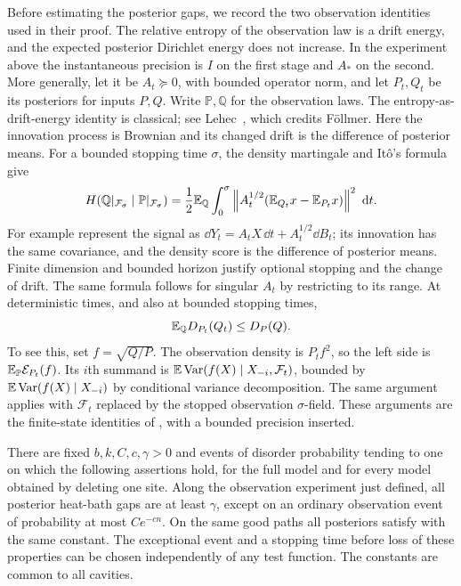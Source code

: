 Before estimating the posterior gaps, we record the two observation
identities used in their proof. The relative entropy of the observation
law is a drift energy, and the expected posterior Dirichlet energy does
not increase. In the experiment above the instantaneous precision is
$I$ on the first stage and $A_*$ on the second. More generally, let it be
$A_t\succeq0$,
with bounded operator norm, and let $P_t,Q_t$ be its posteriors for inputs
$P,Q$.  Write $\mathbb P,\mathbb Q$ for the observation laws.
The entropy-as-drift-energy identity is classical; see
Lehec~\cite[Theorem~2]{Lehec2013}, which credits F\"ollmer. Here the
innovation process is Brownian and its changed drift is the difference
of posterior means. For a bounded stopping time $\sigma$, the density
martingale and It\^o's formula give
\begin{equation}\label{eq:stat-observation-entropy}
 H(\mathbb Q|_{\mathcal F_\sigma}\mid
       \mathbb P|_{\mathcal F_\sigma})
 =\frac12\mathbb E_{\mathbb Q}\int_0^\sigma
  \left\lVert A_t^{1/2}(\mathbb E_{Q_t}x-\mathbb E_{P_t}x)\right\rVert^2\,\,\mathrm d t.
\end{equation}
For example represent the signal as
$\dd Y_t=A_tX\,\dd t+A_t^{1/2}\dd B_t$; its innovation has the same
covariance, and the density score is the difference of posterior means.
Finite dimension and bounded horizon justify optional stopping and the
change of drift.  The same formula follows for singular $A_t$ by
restricting to its range.  At deterministic times, and also at bounded stopping times,
\begin{equation}\label{eq:stat-energy-monotone}
 \mathbb E_{\mathbb Q}D_{P_t}(Q_t)\le D_P(Q).
\end{equation}
To see this, set $f=\sqrt{Q/P}$.  The observation density is $P_tf^2$,
so the left side is $\mathbb E_{\mathbb P}\mathcal E_{P_t}(f)$.
Its $i$th summand is
$\mathbb E\operatorname{Var}(f(X)\mid X_{-i},\mathcal F_t)$, bounded by
$\mathbb E\operatorname{Var}(f(X)\mid X_{-i})$ by conditional variance decomposition. The same
argument applies with $\mathcal F_t$ replaced by the stopped observation
$\sigma$-field.
These arguments are the finite-state identities of
\cite[Section~2]{SKGap}, with a bounded precision inserted.

\begin{proposition}\label{prop:stat-posterior-gap}
There are fixed $b,k,C,c,\gamma>0$ and events of disorder probability
tending to one on which the following assertions hold, for the full model
and for every model obtained by deleting one site.  Along the observation
experiment just defined, all posterior heat-bath gaps are at least
$\gamma$, except on an ordinary observation event of probability at most
$Ce^{-cn}$.  On the same good paths all posteriors satisfy
 with the same constant.  The exceptional event and
a stopping time before loss of these properties can be chosen independently
of any test function.  The constants are common to all cavities.
\end{proposition}

